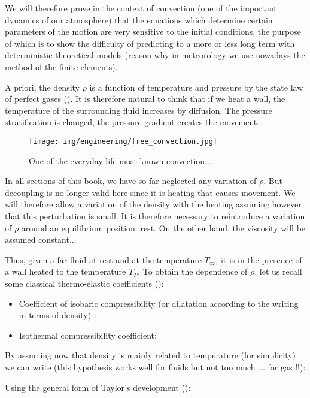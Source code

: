 	We will therefore prove in the context of convection (one of the important dynamics of our atmosphere) that the equations which determine certain parameters of the motion are very sensitive to the initial conditions, the purpose of which is to show the difficulty of predicting to a more or less long term with deterministic theoretical models (reason why in meteorology we use nowadays the method of the finite elements).

	A priori, the density $\rho$ is a function of temperature and pressure by the state law of perfect gases (). It is therefore natural to think that if we heat a wall, the temperature of the surrounding fluid increases by diffusion. The pressure stratification is changed, the pressure gradient creates the movement.
	\begin{figure}[H]
		\centering
		\texttt{[image: img/engineering/free\_convection.jpg]}
		\caption{One of the everyday life most known convection...}
	\end{figure}
	In all sections of this book, we have so far neglected any variation of $\rho$. But decoupling is no longer valid here since it is heating that causes movement. We will therefore allow a variation of the density with the heating assuming however that this perturbation is small. It is therefore necessary to reintroduce a variation of $\rho$ around an equilibrium position: rest. On the other hand, the viscosity will be assumed constant...

	Thus, given a far fluid at rest and at the temperature $T_{\infty}$, it is in the presence of a wall heated to the temperature $T_P$. To obtain the dependence of $\rho$, let us recall some classical thermo-elastic coefficients ():
	\begin{itemize}
		\item Coefficient of isobaric compressibility (or dilatation according to the writing in terms of density) :
		

		\item Isothermal compressibility coefficient:
		
	\end{itemize}
	By assuming now that density is mainly related to temperature (for simplicity) we can write (this hypothesis works well for fluids but not too much ... for gas !!):
	
	Using the general form of Taylor's development ():
	

